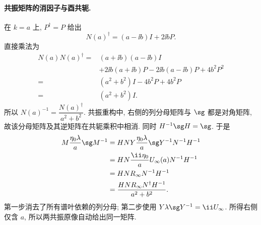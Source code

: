 \paragraph{共振矩阵的消因子与酉共轭.}
在 $k=a$ 上, $P^\dagger=P$ 给出
\[
N(a)^\dagger=(a-\ii b)I+2\ii bP.
\]
直接乘法为
\[
\begin{aligned}
N(a)N(a)^\dagger
={}&(a+\ii b)(a-\ii b)I\\
&+2\ii b(a+\ii b)P
-2\ii b(a-\ii b)P
+4b^2P^2\\
={}&(a^2+b^2)I-4b^2P+4b^2P\\
={}&(a^2+b^2)I.
\end{aligned}
\]
所以 $N(a)^{-1}=\dfrac{N(a)^\dagger}{a^2+b^2}$.
共振重构中, 右侧的列分母矩阵与 $\sg$ 都是对角矩阵,
故该分母矩阵及其逆矩阵在共轭乘积中相消.
同时 $H^{-1}\sg H=\sg$.
于是
\[
\begin{aligned}
M\dfrac{\eta_0\lambda}{a}\sg M^{-1}
&=HN Y\dfrac{\eta_0\lambda}{a}\sg Y^{-1}N^{-1}H^{-1}\\
&=HN\dfrac{\ii\eta_0}{a}U_\infty(a)N^{-1}H^{-1}\\
&=HN R_\infty N^{-1}H^{-1}\\
&=\dfrac{HN R_\infty N^\dagger H^{-1}}{a^2+b^2}.
\end{aligned}
\]
第一步消去了所有谱叶依赖的列分母;
第二步使用 $Y\lambda\sg Y^{-1}=\ii U_\infty$.
所得右侧仅含 $a$, 所以两共振原像自动给出同一矩阵.


